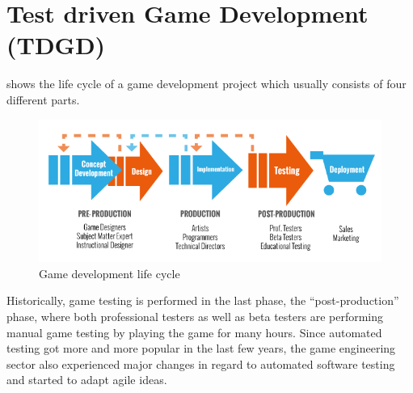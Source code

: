 \section{Test driven Game Development (TDGD)} \label{sec:TDGD}
      shows the life cycle of  a game development project which usually consists of four different parts.

    \begin{figure}[hbtp]
        \centering
        \includegraphics[width=0.95\columnwidth]{img/devCycle.png}
        \caption{Game development life cycle}
        \label{fig:GameDevLifeCylce}
    \end{figure}

    Historically, game testing is performed in the last phase, the ``post-production'' phase, where both professional testers as well as beta testers 
    are performing manual game testing by playing the game for many hours.
    Since automated testing got more and more popular 
    in the last few years, the game engineering sector also experienced major changes in regard to automated software testing
    and started to adapt agile ideas. 

